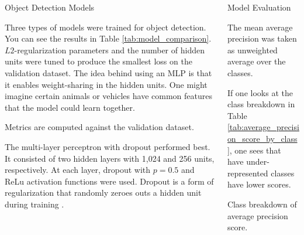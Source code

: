 \documentclass[final]{beamer}
\newlength{\onecolwid}
\newlength{\twocolwid}
\begin{document}
\begin{frame}[t]
\begin{columns}[t]
\begin{column}{\twocolwid}
\begin{columns}[t,totalwidth=\twocolwid]
\begin{column}{\onecolwid}
\begin{block}{Object Detection Models}

  Three types of models were trained for object detection. You can see the
  results in Table \ref{tab:model_comparison}. $L2$-regularization parameters
  and the number of hidden units were tuned to produce the smallest loss on the
  validation dataset. The idea behind using an MLP is that it enables
  weight-sharing in the hidden units. One might imagine certain animals or
  vehicles have common features that the model could learn together.

  \begin{table}
    \centering
    
    \caption{Metrics are computed against the validation dataset.}
    \label{tab:model_comparison}    
  \end{table}

  The multi-layer perceptron with dropout performed best. It consisted of two
  hidden layers with 1,024 and 256 units, respectively. At each layer, dropout
  with $p = 0.5$ and ReLu activation functions were used. Dropout is a form of
  regularization that randomly zeroes outs a hidden unit during training
  \citep{dropout}.
\end{block}



\end{column} %

\begin{column}{\onecolwid}\vspace{-.6in} %


\begin{block}{Model Evaluation}

  The mean average precision was
   taken as
  unweighted average over the classes.

  If one looks at the class breakdown in Table
  \ref{tab:average_precision_score_by_class}, one sees that have
  under-represented classes have lower scores.
  \begin{table}
    \centering
    \scriptsize{}
    \caption{Class breakdown of average precision score.}
    \label{tab:average_precision_score_by_class}
  \end{table}
  

\end{block}
\end{column}
\end{columns}
\end{column}
\end{columns}
\end{frame}
\end{document}
